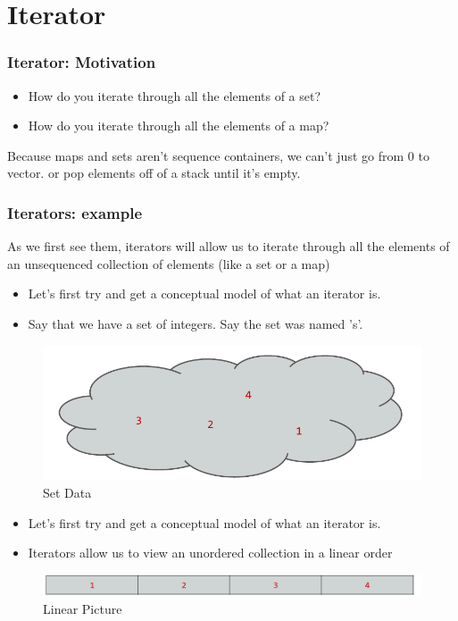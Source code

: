 \documentclass{beamer}
\newtheorem{Key points}{Key points}
\begin{document}
\section{Iterator}
\begin{frame}
  \frametitle{Iterator: Motivation}
  \begin{itemize}
  \item How do you iterate through all the elements
of a set?
\item  How do you iterate through all the elements
of a map?
  \end{itemize}

Because maps and sets aren't sequence
containers, we can't just go from 0 to vector.
or pop elements off of a stack until it's
empty.
\end{frame}
\begin{frame}
  \frametitle{Iterators: example}
  \begin{center}
    \Large{As we first see them, iterators will allow us to
iterate through all the elements of an
unsequenced collection of elements (like a set
or a map)
}
  \end{center}
\end{frame}
\begin{frame}
  \begin{itemize}
  \item  Let's first try and get a conceptual model of
what an iterator is.
\item Say that we have a set of integers. Say the
set was named 's'.
  \end{itemize}
  \begin{figure}
    \centering
         \includegraphics[width=0.9\columnwidth]{itr1.png} 
    \caption{Set Data}
  \end{figure}
\end{frame}

\begin{frame}
  \begin{itemize}
  \item  Let's first try and get a conceptual model of
what an iterator is.
\item Iterators allow us to view an unordered
collection in a linear order
  \end{itemize}
  \begin{figure}
    \centering
         \includegraphics[width=0.9\columnwidth]{itr2.png} 
    \caption{Linear Picture}
  \end{figure}
\end{frame}
\end{document}

